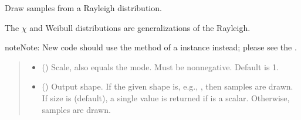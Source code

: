 \documentclass[letterpaper,10pt,english]{sphinxmanual}
\begin{document}

\begin{fulllineitems}
\label{\detokenize{metilda.controllers:metilda.controllers.pitch_art_wizard.rayleigh}}
\pysigstartsignatures
{}
\pysigstopsignatures
\sphinxAtStartPar
Draw samples from a Rayleigh distribution.

\sphinxAtStartPar
The \(\chi\) and Weibull distributions are generalizations of the
Rayleigh.

\begin{sphinxadmonition}{note}{Note:}
\sphinxAtStartPar
New code should use the 
method of a  instance instead;
please see the .
\end{sphinxadmonition}
\begin{quote}\begin{description}
\begin{itemize}
\item {} 
\sphinxAtStartPar
{} (\sphinxstyleliteralemphasis{\sphinxupquote{, }}) \textendash{} Scale, also equals the mode. Must be non\sphinxhyphen{}negative. Default is 1.

\item {} 
\sphinxAtStartPar
{} (\sphinxstyleliteralemphasis{\sphinxupquote{, }}) \textendash{} Output shape.  If the given shape is, e.g., , then
 samples are drawn.  If size is  (default),
a single value is returned if  is a scalar.  Otherwise,
 samples are drawn.


\end{itemize}
\end{description}
\end{quote}
\end{fulllineitems}
\end{document}
